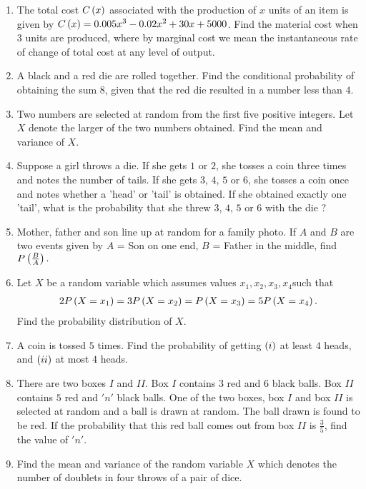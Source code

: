 \begin{enumerate}
\item The total cost $C\left(x\right)$ associated with the production of $x$ units of an item is given by $C\left(x\right) = {0.005x}^3-{0.02x}^2+30x+5000$. Find the material cost when $3$ units are produced, where by marginal cost we mean the instantaneous rate of change of total cost at any level of output.

		
\item A black and a red die are rolled together. Find the conditional probability of obtaining the sum $8$, given that the red die resulted in a number less than $4$.
\item Two numbers are selected at random  from the first five positive integers. Let $X$ denote the larger of the two numbers obtained. Find the mean and variance of $X$.
\item  Suppose a girl throws a die. If she gets $1$ or $2$, she tosses a coin three times and notes the number of tails. If she gets $3$, $4$, $5$ or $6$, she tosses a coin once and notes whether a 'head' or 'tail' is obtained. If she obtained exactly one 'tail', what is the probability that she threw $3$, $4$, $5$ or $6$ with the die ? 

\item Mother, father and son line up at random for a family photo. If $A$ and $B$ are two events given by $A$ = Son on one end, $B$ = Father in the middle, find $P\left(\frac{B}{A}\right).$
\item Let $X$ be a random variable which assumes values $x_1, x_2, x_3, x_4 $such that 
 \begin{align*}    
   2P\left(X = x_1\right) = 3P\left(X = x_2\right)= P\left(X = x_3\right)= 5P\left(X = x_4\right).
\end{align*}Find the probability distribution of $X$.
 \item A coin is tossed $5$ times. Find the probability of getting $\left(i\right)$ at least $4$ heads, and $\left(ii\right)$ at most $4 $ heads.
\item There are two boxes $I$ and $II$. Box $I$ contains $3$ red and $6$ black balls. Box $II$ contains $5$ red and $'n'$ black balls. One of the two boxes, box $I$ and box $II$ is selected at random and a ball is drawn at random. The ball drawn is found to be red. If the probability that this red ball comes out from box $II$ is $\frac{3}{5}$, find the value of $'n'$. 

\item Find the mean and variance of the random variable $X$ which denotes the number of doublets in four throws of a pair of dice.


\end{enumerate}
